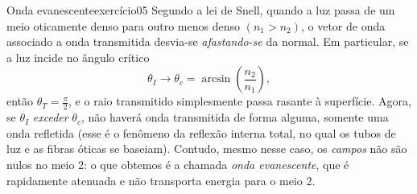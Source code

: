 \begin{exercício}{Onda evanescente}{exercício05}
    Segundo a lei de Snell, quando a luz passa de um meio oticamente denso para outro menos denso \((n_1 > n_2)\), o vetor de onda associado a onda transmitida desvia-se \emph{afastando-se} da normal. Em particular, se a luz incide no ângulo crítico
    \begin{equation*}
        \theta_I \to \theta_c = \arcsin\left(\frac{n_2}{n_1}\right),
    \end{equation*}
    então \(\theta_T = \frac{\pi}{2}\), e o raio transmitido simplesmente passa rasante à superfície. Agora, se \(\theta_I\) \emph{exceder} \(\theta_c\), não haverá onda transmitida de forma alguma, somente uma onda refletida (esse é o fenômeno da reflexão interna total, no qual os tubos de luz e as fibras óticas se baseiam). Contudo, mesmo nesse caso, os \emph{campos} não são nulos no meio 2: o que obtemos é a chamada \emph{onda evanescente}, que é rapidamente atenuada e não transporta energia para o meio 2.


\end{exercício}
